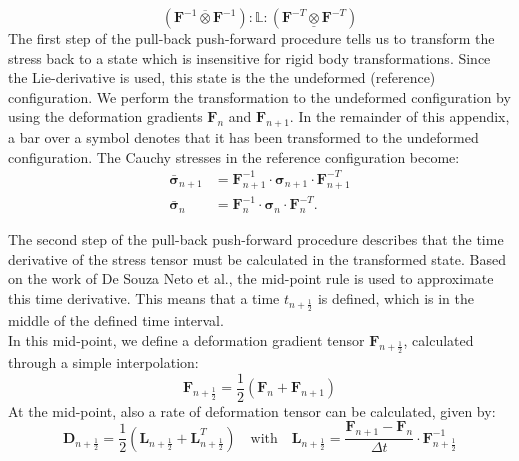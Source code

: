{{\begin{equation}
(\boldsymbol{F}^{-1}\overline{\otimes}\boldsymbol{F}^{-1}):\boldsymbol{\mathbb L}:(\boldsymbol{F}^{-T}\underline{\otimes}\boldsymbol{F}^{-T})
\end{equation}
The first step of the pull-back push-forward procedure tells us to transform the stress back to a state which is insensitive for rigid body transformations. Since the Lie-derivative is used, this state is the the undeformed (reference) configuration. We perform the transformation to the undeformed configuration by using the deformation gradients $\boldsymbol{F}_n$ and $\boldsymbol{F}_{n+1}$. In the remainder of this appendix, a bar over a symbol denotes that it has been transformed to the undeformed configuration. The Cauchy stresses in the reference configuration become:
\begin{equation}
\left.\begin{aligned}
\bar{\boldsymbol{\sigma}}_{n+1} &=\boldsymbol{F}_{n+1}^{-1}\cdot\boldsymbol{\sigma}_{n+1}\cdot\boldsymbol{F}_{n+1}^{-T}\\
\bar{\boldsymbol{\sigma}}_{n} &= \boldsymbol{F}^{-1}_{n}\cdot\boldsymbol{\sigma}_{n}\cdot\boldsymbol{F}_{n}^{-T}.
\end{aligned}\right.
\label{Ch3_stressbar}
\end{equation}

The second step of the pull-back push-forward procedure describes that the time derivative of the stress tensor must be calculated in the transformed state.  Based on the work of De Souza Neto et al.\cite{compmethodsplasticity}{\color{red}{check this reference}}, the mid-point rule is used to approximate this time derivative. This means that a time $t_{n+\frac{1}{2}}$ is defined, which is in the middle of the defined time interval.\\
In this mid-point, we define a deformation gradient tensor $\boldsymbol{F}_{n+\frac{1}{2}}$, calculated through a simple interpolation:
\begin{equation}
\boldsymbol{F}_{n+\frac{1}{2}} = \frac{1}{2}(\boldsymbol{F}_{n}+\boldsymbol{F}_{n+1})
\end{equation}
At the mid-point, also a rate of deformation tensor can be calculated, given by:
\begin{equation}
\boldsymbol{D}_{n+\frac{1}{2}} = \frac{1}{2}(\boldsymbol{L}_{n+\frac{1}{2}}+\boldsymbol{L}_{n+\frac{1}{2}}^T)\quad\text{with}\quad \boldsymbol{L}_{n+\frac{1}{2}} = \frac{\boldsymbol{F}_{n+1}-\boldsymbol{F}_n}{\Delta t}\cdot \boldsymbol{F}_{n+\frac{1}{2}}^{-1}
\end{equation}

}}
